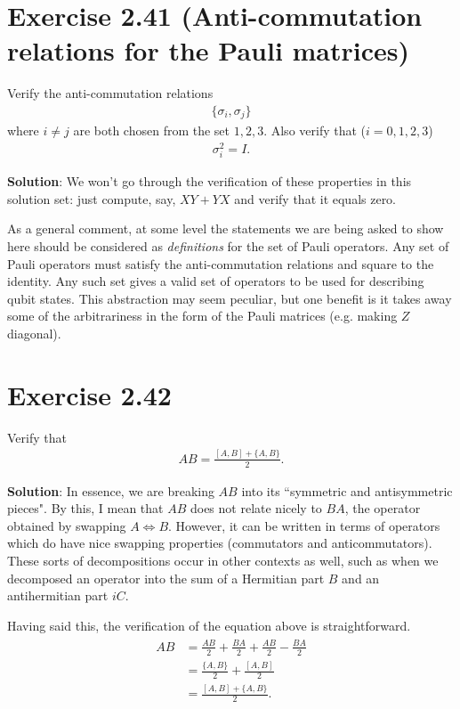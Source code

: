 \documentclass{book}
\begin{document}
\section*{Exercise 2.41 (Anti-commutation relations for the Pauli matrices)}
    Verify the anti-commutation relations
    \begin{align}
        \{\sigma_i, \sigma_j\}
    \end{align}
    where $i\neq j$ are both chosen from the set $1, 2, 3$. Also verify that ($i = 0,1,2,3$)
    \begin{align}
        \sigma_i^2 = I.
    \end{align}
    
    \textbf{Solution}: We won't go through the verification of these properties in this solution set: just compute, say, $XY + YX$ and verify that it equals zero. 
    
    As a general comment, at some level the statements we are being asked to show here should be considered as \emph{definitions} for the set of Pauli operators. Any set of Pauli operators must satisfy the anti-commutation relations and square to the identity. Any such set gives a valid set of operators to be used for describing qubit states. This abstraction may seem peculiar, but one benefit is it takes away some of the arbitrariness in the form of the Pauli matrices (e.g. making $Z$ diagonal). 
    
\section*{Exercise 2.42} 
    Verify that 
    \begin{align}
        AB = \frac{[A,B] + \{A,B\}}{2}.
    \end{align}
    
    \textbf{Solution}: In essence, we are breaking $AB$ into its ``symmetric and antisymmetric pieces". By this, I mean that $AB$ does not relate nicely to $BA$, the operator obtained by swapping $A \Leftrightarrow B$. However, it can be written in terms of operators which do have nice swapping properties (commutators and anticommutators). These sorts of decompositions occur in other contexts as well, such as when we decomposed an operator into the sum of a Hermitian part $B$ and an antihermitian part $iC$. 
    
    Having said this, the verification of the equation above is straightforward.
    \begin{align}
    \begin{aligned}
        AB &= \frac{AB}{2} + \frac{BA}{2} + \frac{AB}{2} - \frac{BA}{2} \\
        &= \frac{\{A,B\}}{2} + \frac{[A,B]}{2} \\
        &= \frac{[A,B] + \{A,B\}}{2}.
    \end{aligned}
    \end{align}
    
\end{document}
